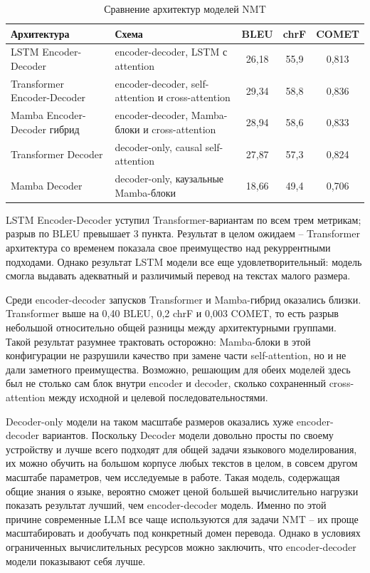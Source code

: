 \begin{table}[H]
	\centering
	\caption{Сравнение архитектур моделей NMT}
	\label{tab:architecture-comparison}
	\begin{tabularx}{\textwidth}{|p{}|X|c|c|c|}
		\hline
		\textbf{Архитектура}         & \textbf{Схема}                                    & \textbf{BLEU} & \textbf{chrF} & \textbf{COMET} \\
		\hline
		LSTM Encoder-Decoder         & encoder-decoder, LSTM с attention                 & 26{,}18       & 55{,}9        & 0{,}813        \\
		\hline
		Transformer Encoder-Decoder  & encoder-decoder, self-attention и cross-attention & 29{,}34       & 58{,}8        & 0{,}836        \\
		\hline
		Mamba Encoder-Decoder гибрид & encoder-decoder, Mamba-блоки и cross-attention    & 28{,}94       & 58{,}6        & 0{,}833        \\
		\hline
		Transformer Decoder          & decoder-only, causal self-attention               & 27{,}87       & 57{,}3        & 0{,}824        \\
		\hline
		Mamba Decoder                & decoder-only, каузальные Mamba-блоки              & 18{,}66       & 49{,}4        & 0{,}706        \\
		\hline
	\end{tabularx}
\end{table}

LSTM Encoder-Decoder уступил Transformer-вариантам по всем трем метрикам; разрыв по BLEU превышает 3 пункта. Результат в целом ожидаем -- Transformer архитектура со временем показала свое преимущество над рекуррентными подходами.
Однако результат LSTM модели все еще удовлетворительный: модель смогла выдавать адекватный и различимый перевод на текстах малого размера.

Среди encoder-decoder запусков Transformer и Mamba-гибрид оказались близки. Transformer выше на 0{,}40 BLEU, 0{,}2 chrF и 0{,}003 COMET, то есть разрыв небольшой относительно общей разницы между архитектурными группами. Такой результат разумнее трактовать осторожно: Mamba-блоки в этой конфигурации не разрушили качество при замене части self-attention, но и не дали заметного преимущества. Возможно, решающим для обеих моделей здесь был не столько сам блок внутри encoder и decoder, сколько сохраненный cross-attention между исходной и целевой последовательностями.

Decoder-only модели на таком масштабе размеров оказались хуже encoder-decoder вариантов.
Поскольку Decoder модели довольно просты по своему устройству и лучше всего подходят для общей задачи языкового моделирования, их можно обучить на большом корпусе любых текстов в целом, в совсем другом масштабе параметров, чем исследуемые в работе.
Такая модель, содержащая общие знания о языке, вероятно сможет ценой большей вычислительно нагрузки показать результат лучший, чем encoder-decoder модель.
Именно по этой причине современные LLM все чаще используются для задачи NMT -- их проще масштабировать и дообучать под конкретный домен перевода.
Однако в условиях ограниченных вычислительных ресурсов можно заключить, что encoder-decoder модели показывают себя лучше.

